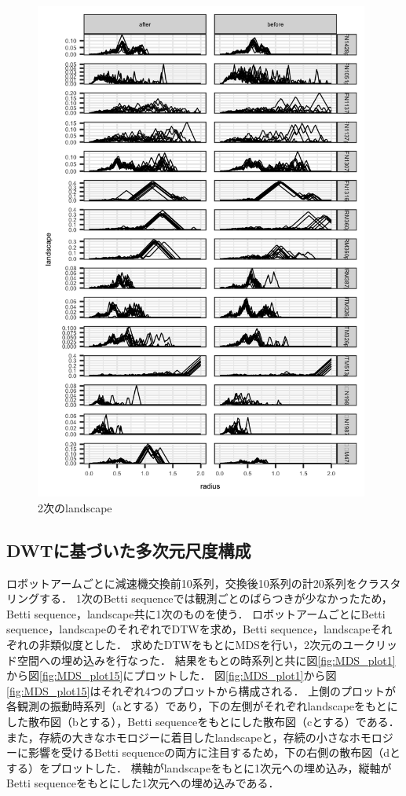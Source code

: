 \documentclass{jarticle}
\begin{document}
\begin{figure}[H]
\begin{center}
	\includegraphics[width=11cm]{fig/land_2.png}	
	\caption{2次のlandscape}\label{fig:land2}
\end{center}
\end{figure}


\subsection{DWTに基づいた多次元尺度構成}

ロボットアームごとに減速機交換前10系列，交換後10系列の計20系列をクラスタリングする．
1次のBetti sequenceでは観測ごとのばらつきが少なかったため，Betti sequence，landscape共に1次のものを使う．
ロボットアームごとにBetti sequence，landscapeのそれぞれでDTWを求め，Betti sequence，landscapeそれぞれの非類似度とした．
求めたDTWをもとにMDSを行い，2次元のユークリッド空間への埋め込みを行なった．
結果をもとの時系列と共に図\ref{fig:MDS_plot1}から図\ref{fig:MDS_plot15}にプロットした．
図\ref{fig:MDS_plot1}から図\ref{fig:MDS_plot15}はそれぞれ4つのプロットから構成される．
上側のプロットが各観測の振動時系列（aとする）であり，下の左側がそれぞれlandscapeをもとにした散布図（bとする），Betti sequenceをもとにした散布図（cとする）である．
また，存続の大きなホモロジーに着目したlandscapeと，存続の小さなホモロジーに影響を受けるBetti sequenceの両方に注目するため，下の右側の散布図（dとする）をプロットした．
横軸がlandscapeをもとに1次元への埋め込み，縦軸がBetti sequenceをもとにした1次元への埋め込みである．
\end{document}

